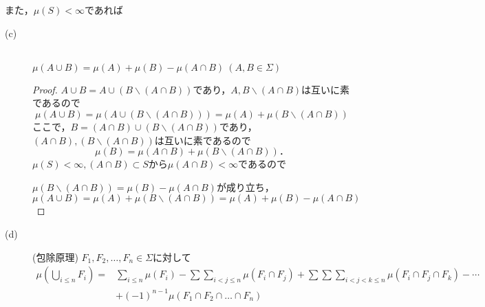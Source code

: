 \documentclass{jsarticle}
\begin{document}
また，$\mu(S)<\infty$であれば
\begin{description}
    \item[(c)]\mbox{}\\
        $\mu(A\cup B) = \mu(A)+\mu(B)-\mu(A\cap B) \ (A,B\in\Sigma)$
        \\
       
        \begin{proof}
            $A\cup B=A\cup(B\backslash (A\cap B))$であり，$A,B\backslash (A\cap B)$は互いに素であるので
            \begin{equation}
                \mu(A\cup B) = \mu(A\cup (B\backslash (A\cap B))) = \mu(A)+\mu(B\backslash (A\cap B)) \nonumber
            \end{equation}
            ここで，$B=(A\cap B)\cup(B\backslash (A\cap B))$であり，$(A\cap B),(B\backslash (A\cap B))$は互いに素であるので
            \begin{equation}
                \mu(B)=\mu(A\cap B)+\mu(B\backslash (A\cap B)) ．\nonumber
            \end{equation}
            $\mu(S)<\infty,(A\cap B) \subset S$から$\mu(A\cap B)<\infty$であるので
            
            $\mu(B\backslash (A\cap B))=\mu(B)-\mu(A\cap B)$が成り立ち，
            \begin{equation}
                \mu(A\cup B) = \mu(A)+\mu(B\backslash (A\cap B)) = \mu(A)+\mu(B)-\mu(A\cap B) \nonumber
            \end{equation}
        \end{proof}
   
    \item[(d)] (包除原理)
        $F_1,F_2,\dots,F_n\in\Sigma$に対して
        \begin{equation}
        \begin{split}
            \mu(\bigcup_{i\leq n}F_i) = &\sum_{i\leq n}\mu(F_i) -  \sum\sum_{i<j\leq n}\mu(F_i\cap F_j) + \sum\sum\sum_{i<j<k\leq n}\mu(F_i\cap F_j\cap F_k) - \cdots
            \\ &+ (-1)^{n-1}\mu(F_1\cap F_2\cap\dots\cap F_n) \nonumber
        \end{split}
        \end{equation}
        \\
        

\end{description}
\end{document}
